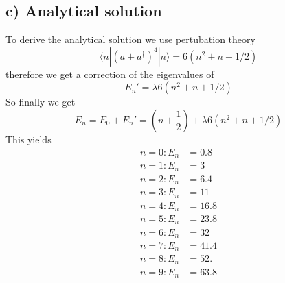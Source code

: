 \documentclass[12pt,a4paper]{article}
\begin{document}
\subsection*{c) Analytical solution}
To derive the analytical solution we use pertubation theory
\begin{equation}
\langle n|(a+a^{\dagger})^4|n\rangle=6(n^2+n+1/2)
\end{equation}
therefore we get a correction of the eigenvalues of
\begin{equation}
E_n'=\lambda6(n^2+n+1/2)
\end{equation}
So finally we get
\begin{equation}
E_n=E_0+E_n'=\left(n+\frac{1}{2}\right)+\lambda6(n^2+n+1/2)
\end{equation}
This yields
\begin{align*}
n = 0: E_n &= 0.8\\
n = 1: E_n &= 3\\
n = 2: E_n &= 6.4\\
n = 3: E_n &= 11\\
n = 4: E_n &= 16.8\\
n = 5: E_n &= 23.8\\
n = 6: E_n &= 32\\
n = 7: E_n &= 41.4\\
n = 8: E_n &= 52.\\
n = 9: E_n &= 63.8\\
\end{align*}
\begin{center}
\end{center}
\end{document}
